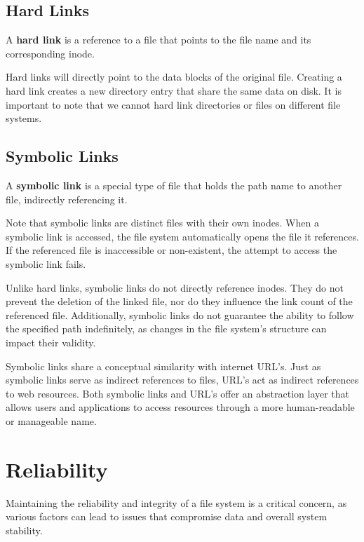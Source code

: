 \documentclass{report}
\newcommand{\definitionBegin}[1]{\begin{tcolorbox}[title={Definition: #1}]}
\newcommand{\definitionEnd}{\end{tcolorbox}}
\newcommand{\exampleBegin}[1]{\begin{tcolorbox}[colback=blue!5!white,colframe=black!75!blue,title={Example:
      #1}]}
\newcommand{\exampleEnd}{\end{tcolorbox}}
\begin{document}
\subsection{Hard Links}
\definitionBegin{Hard Link}
A \textbf{hard link} is a reference to a file that points to the file name and its corresponding
inode. 
\definitionEnd

Hard links will directly point to the data blocks of the original file. Creating a hard link creates
a new directory entry that share the same data on disk. It is important to note that we cannot hard
link directories or files on different file systems.


\subsection{Symbolic Links}
\definitionBegin{Symbolic Link}
A \textbf{symbolic link} is a special type of file that holds the path name to another file,
indirectly referencing it.
\definitionEnd

Note that symbolic links are distinct files with their own inodes. When a symbolic link is accessed,
the file system automatically opens the file it references. If the referenced file is inaccessible
or non-existent, the attempt to access the symbolic link fails.

Unlike hard links, symbolic links do not directly reference inodes. They do not prevent the deletion
of the linked file, nor do they influence the link count of the referenced file. Additionally,
symbolic links do not guarantee the ability to follow the specified path indefinitely, as changes in
the file system's structure can impact their validity.

\exampleBegin{Kinda Like URL's!}
Symbolic links share a conceptual similarity with internet URL's. Just as symbolic links serve as
indirect references to files, URL's act as indirect references to web resources. Both symbolic links
and URL's offer an abstraction layer that allows users and applications to access resources through a
more human-readable or manageable name.
\exampleEnd





\section{Reliability}
Maintaining the reliability and integrity of a file system is a critical concern, as various factors
can lead to issues that compromise data and overall system stability.
\end{document}
